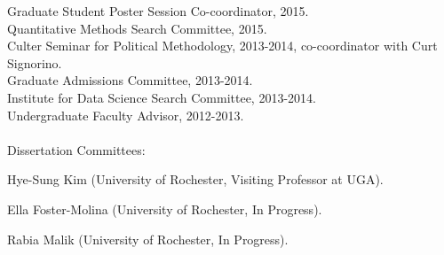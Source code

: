 \documentclass[margin,line,12pt]{res}
\newenvironment{list1}{
  \begin{list}{\ding{113}}{%
      \setlength{\itemsep}{0in}
      \setlength{\parsep}{0in} \setlength{\parskip}{0in}
      \setlength{\topsep}{0in} \setlength{\partopsep}{0in} 
      \setlength{\leftmargin}{0.83 cm}}}{\end{list}}
\begin{document}
\begin{resume}
\begin{list1}
\end{list1}
Graduate Student Poster Session Co-coordinator, 2015. \\
Quantitative Methods Search Committee, 2015. \\
Culter Seminar for Political Methodology, 2013-2014, co-coordinator with Curt Signorino. \\
Graduate Admissions Committee, 2013-2014.\\
Institute for Data Science Search Committee, 2013-2014.\\
Undergraduate Faculty Advisor, 2012-2013. \\ 
\\
Dissertation Committees:
\begin{list1}
\item[] Hye-Sung Kim (University of Rochester, Visiting Professor at UGA).
\item[] Ella Foster-Molina (University of Rochester, In Progress).
\item[] Rabia Malik (University of Rochester, In Progress).
\end{list1}




\end{resume}
\end{document}
